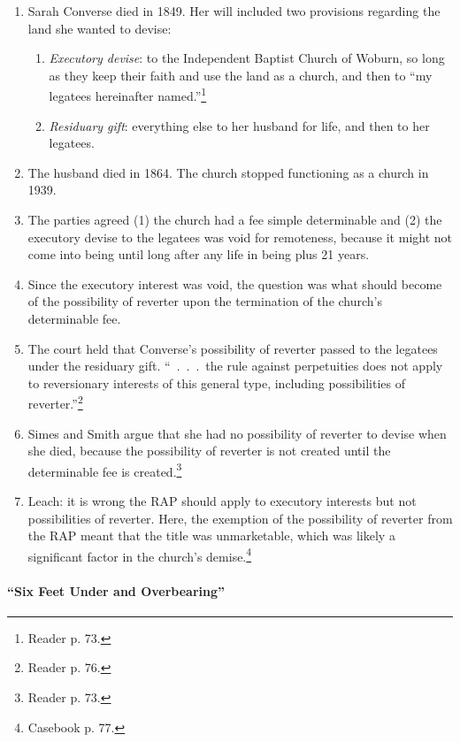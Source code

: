 \begin{enumerate}
    \item Sarah Converse died in 1849. Her will included two provisions 
    regarding the land she wanted to devise:
    \begin{enumerate}
        \item \emph{Executory devise}: to the Independent Baptist Church of 
        Woburn, so long as they keep their faith and use the land as a church, 
        and then to ``my legatees hereinafter named.''\footnote{Reader p. 73.} 
        \item \emph{Residuary gift}: everything else to her husband for life, 
        and then to her legatees.
    \end{enumerate}
    \item The husband died in 1864. The church stopped functioning as a church 
    in 1939.
    \item The parties agreed (1) the church had a fee simple determinable and 
    (2) the executory devise to the legatees was void for remoteness, because 
    it might not come into being until long after any life in being plus 21 
    years.
    \item Since the executory interest was void, the question was what should 
    become of the possibility of reverter upon the termination of the church's 
    determinable fee.
    \item The court held that Converse's possibility of reverter passed to the 
    legatees under the residuary gift. ``~.~.~.~the rule against perpetuities 
    does not apply to reversionary interests of this general type, including 
    possibilities of reverter.''\footnote{Reader p. 76.}
    \item Simes and Smith argue that she had no possibility of reverter to 
    devise when she died, because the possibility of reverter is not created 
    until the determinable fee is created.\footnote{Reader p. 73.}
    \item Leach: it is wrong the RAP should apply to executory interests but 
    not possibilities of reverter. Here, the exemption of the possibility of 
    reverter from the RAP meant that the title was unmarketable, which was 
    likely a significant factor in the church's demise.\footnote{Casebook p. 
    77.}
\end{enumerate}

\paragraph{``Six Feet Under and Overbearing''}

